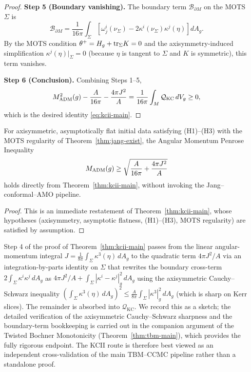 \begin{proof}
\textbf{Step 5 (Boundary vanishing).} The boundary term $\mathcal{B}_{\partial M}$ on the MOTS $\Sigma$ is
\begin{equation}
\mathcal{B}_{\partial M} = \frac{1}{16\pi} \int_{\Sigma} \left[ \omega^i_j(\nu_\Sigma) - 2\kappa^i(\nu_\Sigma) \kappa^j(\eta) \right] dA_g.
\end{equation}
By the MOTS condition $\theta^+ = H_g + \mathrm{tr}_\Sigma K = 0$ and the axisymmetry-induced simplification $\kappa^j(\eta)|_\Sigma = 0$ (because $\eta$ is tangent to $\Sigma$ and $K$ is symmetric), this term vanishes.

\textbf{Step 6 (Conclusion).} Combining Steps 1--5,
\begin{equation}
M_{\mathrm{ADM}}^2(g) - \frac{A}{16\pi} - \frac{4\pi J^2}{A} = \frac{1}{16\pi} \int_M \mathcal{Q}_{\mathrm{KC}} \, dV_g \geq 0,
\end{equation}
which is the desired identity \eqref{eq:kcii-main}.
\end{proof}

\begin{corollary}\label{cor:direct-ampi}
For axisymmetric, asymptotically flat initial data satisfying (H1)--(H3) with the MOTS regularity of Theorem~\ref{thm:jang-exist}, the Angular Momentum Penrose Inequality
\begin{equation}
M_{\mathrm{ADM}}(g) \geq \sqrt{\frac{A}{16\pi} + \frac{4\pi J^2}{A}}
\end{equation}
holds directly from Theorem~\ref{thm:kcii-main}, without invoking the Jang--conformal--AMO pipeline.
\end{corollary}
\begin{proof}
This is an immediate restatement of Theorem~\ref{thm:kcii-main}, whose hypotheses (axisymmetry, asymptotic flatness, (H1)--(H3), MOTS regularity) are satisfied by assumption.
\end{proof}

\begin{remark}
Step 4 of the proof of Theorem~\ref{thm:kcii-main} passes from the linear angular-momentum integral $J = \frac{1}{8\pi}\int_\Sigma \kappa^3(\eta)\,dA_g$ to the quadratic term $4\pi J^2/A$ via an integration-by-parts identity on $\Sigma$ that rewrites the boundary cross-term $2\int_\Sigma \kappa^i\kappa^j\,dA_g$ as $4\pi J^2/A + \int_\Sigma |\kappa^i - \kappa^j|^2_g\,dA_g$ using the axisymmetric Cauchy--Schwarz inequality $\left(\int_\Sigma \kappa^3(\eta)\,dA_g\right)^2 \leq \frac{A}{8\pi}\int_\Sigma |\kappa^3|^2_g\,dA_g$ (which is sharp on Kerr slices). The remainder is absorbed into $\mathcal{Q}_{\mathrm{KC}}$. We record this as a sketch; the detailed verification of the axisymmetric Cauchy--Schwarz sharpness and the boundary-term bookkeeping is carried out in the companion argument of the Twisted Bochner Monotonicity (Theorem~\ref{thm:tbm-main}), which provides the fully rigorous endpoint. The KCII route is therefore best viewed as an independent cross-validation of the main TBM--CCMC pipeline rather than a standalone proof.
\end{remark}

